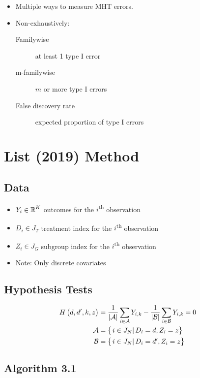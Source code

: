 \documentclass[10pt]{article}
\begin{document}
	\begin{itemize}
		\item Multiple ways to measure MHT errors.
		\item Non-exhaustively:
		\begin{description}
			\item[Familywise] at least 1 type I error
			\item[m-familywise] $m$ or more type I errors
			\item[False discovery rate] expected proportion of type I errors
		\end{description}
	\end{itemize}

	\section{List (2019) Method}

	\subsection{Data}

	\begin{itemize}
		\item $Y_i\in \operatorname{\mathbb{R}}^K$ outcomes for the $i$\textsuperscript{th} observation
		\item $D_i\in J_T$ treatment index for the $i$\textsuperscript{th} observation
		\item $Z_i\in J_G$ subgroup index for the $i$\textsuperscript{th} observation
		\item Note: Only discrete covariates
	\end{itemize}

	\subsection{Hypothesis Tests}

	\begin{align*}
		\hypTest{d,d^\prime,k,z} &= \frac{1}{\wrapAbs{\mathcal{A}}}\sum_{i\in\mathcal{A}} Y_{i,k} - \frac{1}{\wrapAbs{\mathcal{B}}}\sum_{i\in\mathcal{B}} Y_{i,k} = 0 \\
		\mathcal{A} &= \set{i\in J_N}{D_i=d, Z_i=z} \\
		\mathcal{B} &= \set{i\in J_N}{D_i=d^\prime, Z_i=z}
	\end{align*}

	\subsection{Algorithm 3.1}
\end{document}
